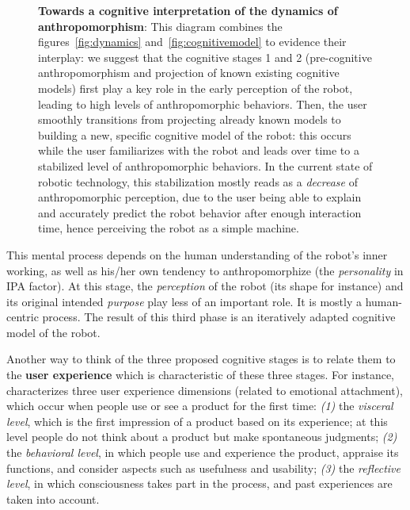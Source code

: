 \documentclass{frontiersSCNS} %
\begin{document}
\begin{figure}[]
\begin{tikzpicture}
\end{tikzpicture}
\caption{\textbf{Towards a cognitive interpretation of the dynamics of
    anthropomorphism}: This diagram combines the figures~\ref{fig:dynamics}
    and~\ref{fig:cognitivemodel} to evidence their interplay: we suggest that
    the cognitive stages 1 and 2 (pre-cognitive anthropomorphism and projection
    of known existing cognitive models) first play a key role in the early
    perception of the robot, leading to high levels of anthropomorphic
    behaviors. Then, the user smoothly transitions from projecting already known
    models to building a new, specific cognitive model of the robot: this occurs
    while the user familiarizes with the robot and leads over time to a
    stabilized level of anthropomorphic behaviors. In the current state of
    robotic technology, this stabilization mostly reads as a \emph{decrease} of
    anthropomorphic perception, due to the user being able to explain and
    accurately predict the robot behavior after enough interaction time, hence
    perceiving the robot as a simple machine.}

\label{fig:mix}
\end{figure}


This mental process depends on the human understanding of the robot's inner
working, as well as his/her own tendency to anthropomorphize (the
\emph{personality} in IPA factor). At this stage, the \emph{perception} of the
robot (its shape for instance) and its original intended \emph{purpose} play
less of an important role. It is mostly a human-centric process.  The result of
this third phase is an iteratively adapted cognitive model of the robot.

Another way to think of the three proposed cognitive stages is to relate them to
the \textbf{user experience} which is characteristic of these three stages. For
instance, \cite{norman_emotional_2003} characterizes  three user experience
dimensions (related to emotional attachment), which occur when people use or see
a product for the first time: \emph{(1)} the \emph{visceral level}, which is the
first impression of a product based on its experience; at this level people do
not think about a product but make spontaneous judgments; \emph{(2)} the
\emph{behavioral level}, in which people use and experience the product,
appraise its functions, and consider aspects such as usefulness and usability;
\emph{(3)} the \emph{reflective level}, in which consciousness takes part in the
process, and past experiences are taken into account.
\end{document}

